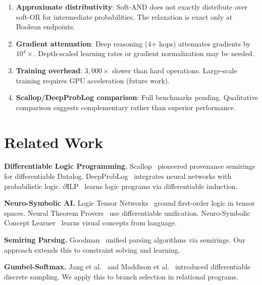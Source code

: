 \documentclass[11pt,a4paper]{article}
\begin{document}
\begin{enumerate}
  \item \textbf{Approximate distributivity}: Soft-AND does not exactly distribute over soft-OR for intermediate probabilities. The relaxation is exact only at Boolean endpoints.

  \item \textbf{Gradient attenuation}: Deep reasoning (4+ hops) attenuates gradients by $10^4\times$. Depth-scaled learning rates or gradient normalization may be needed.

  \item \textbf{Training overhead}: $3{,}000\times$ slower than hard operations. Large-scale training requires GPU acceleration (future work).

  \item \textbf{Scallop/DeepProbLog comparison}: Full benchmarks pending. Qualitative comparison suggests complementary rather than superior performance.
\end{enumerate}

\section{Related Work}
\label{sec:related_chirho}

\textbf{Differentiable Logic Programming.}
Scallop~\cite{scallop_chirho} pioneered provenance semirings for differentiable Datalog.
DeepProbLog~\cite{deepproblog_chirho} integrates neural networks with probabilistic logic.
$\partial$ILP~\cite{dilp_chirho} learns logic programs via differentiable induction.

\textbf{Neuro-Symbolic AI.}
Logic Tensor Networks~\cite{ltn_chirho} ground first-order logic in tensor spaces.
Neural Theorem Provers~\cite{neural_theorem_provers_chirho} use differentiable unification.
Neuro-Symbolic Concept Learner~\cite{nscl_chirho} learns visual concepts from language.

\textbf{Semiring Parsing.}
Goodman~\cite{goodman_semiring_chirho} unified parsing algorithms via semirings.
Our approach extends this to constraint solving and learning.

\textbf{Gumbel-Softmax.}
Jang et al.~\cite{gumbel_softmax_chirho} and Maddison et al.~\cite{concrete_chirho} introduced differentiable discrete sampling.
We apply this to branch selection in relational programs.
\end{document}
